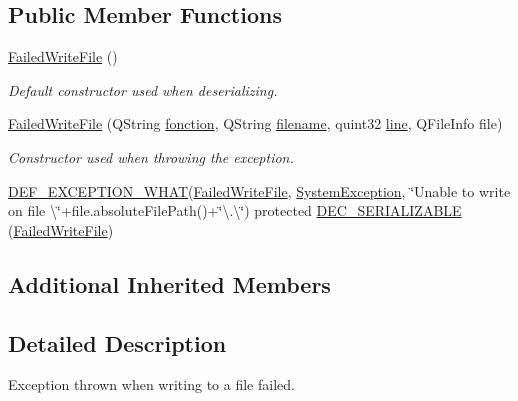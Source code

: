 \subsection*{Public Member Functions}
\begin{DoxyCompactItemize}
\item 
\hyperlink{class_gost_crypt_1_1_failed_write_file_aa4dd5774c88569ea2c868b85af61ea3f}{Failed\+Write\+File} ()
\begin{DoxyCompactList}\small\item\em Default constructor used when deserializing. \end{DoxyCompactList}\item 
\hyperlink{class_gost_crypt_1_1_failed_write_file_ae2eecc02373b2710df827e72a3226c26}{Failed\+Write\+File} (Q\+String \hyperlink{class_gost_crypt_1_1_gost_crypt_exception_a29b8c93d5efbb1ff369107385725a939}{fonction}, Q\+String \hyperlink{class_gost_crypt_1_1_gost_crypt_exception_a749a12375f4ba9d502623b99d8252f38}{filename}, quint32 \hyperlink{class_gost_crypt_1_1_gost_crypt_exception_abf506d911f12a4e969eea500f90bd32c}{line}, Q\+File\+Info file)
\begin{DoxyCompactList}\small\item\em Constructor used when throwing the exception. \end{DoxyCompactList}\item 
\hyperlink{_gost_crypt_exception_8h_a5bc1e1c6c9d6f46c84eeba49e33355f9}{D\+E\+F\+\_\+\+E\+X\+C\+E\+P\+T\+I\+O\+N\+\_\+\+W\+H\+AT}(\hyperlink{class_gost_crypt_1_1_failed_write_file}{Failed\+Write\+File}, \hyperlink{class_gost_crypt_1_1_system_exception}{System\+Exception}, \char`\"{}Unable to write on file \textbackslash{}\char`\"{}+file.\+absolute\+File\+Path()+\char`\"{}\textbackslash{}.\textbackslash{}\char`\"{}) protected \hyperlink{class_gost_crypt_1_1_failed_write_file_a407ae185167aa4f1dce35088de26316a}{D\+E\+C\+\_\+\+S\+E\+R\+I\+A\+L\+I\+Z\+A\+B\+LE} (\hyperlink{class_gost_crypt_1_1_failed_write_file}{Failed\+Write\+File})
\end{DoxyCompactItemize}
\subsection*{Additional Inherited Members}


\subsection{Detailed Description}
Exception thrown when writing to a file failed. 

